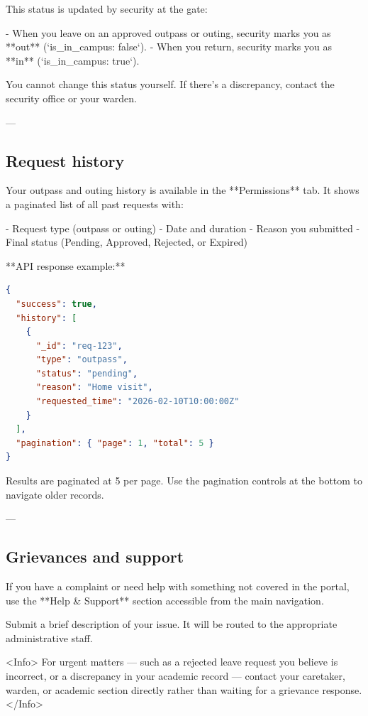 \begin{tcolorbox}[colback=gray!5,colframe=primary,title=Documentation Note]
This status is updated by security at the gate:

- When you leave on an approved outpass or outing, security marks you as **out** (`is_in_campus: false`).
- When you return, security marks you as **in** (`is_in_campus: true`).

You cannot change this status yourself. If there's a discrepancy, contact the security office or your warden.

---

\subsection{Request history}

Your outpass and outing history is available in the **Permissions** tab. It shows a paginated list of all past requests with:

- Request type (outpass or outing)
- Date and duration
- Reason you submitted
- Final status (Pending, Approved, Rejected, or Expired)

**API response example:**

\begin{lstlisting}[language=json]
{
  "success": true,
  "history": [
    {
      "_id": "req-123",
      "type": "outpass",
      "status": "pending",
      "reason": "Home visit",
      "requested_time": "2026-02-10T10:00:00Z"
    }
  ],
  "pagination": { "page": 1, "total": 5 }
}

\end{lstlisting}

Results are paginated at 5 per page. Use the pagination controls at the bottom to navigate older records.

---

\subsection{Grievances and support}

If you have a complaint or need help with something not covered in the portal, use the **Help & Support** section accessible from the main navigation.

Submit a brief description of your issue. It will be routed to the appropriate administrative staff.

<Info>
  For urgent matters — such as a rejected leave request you believe is
  incorrect, or a discrepancy in your academic record — contact your caretaker,
  warden, or academic section directly rather than waiting for a grievance
  response.
</Info>



\end{tcolorbox}
